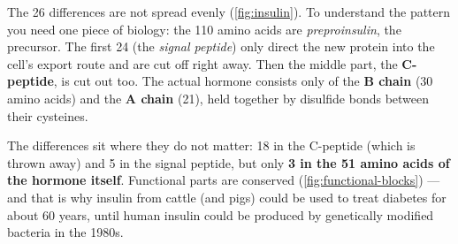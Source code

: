 \documentclass[11pt, oneside]{book}
\begin{document}
\begin{exbox}[title={Where are the differences --- and why there}]
The 26 differences are not spread evenly (\cref{fig:insulin}). To understand
the pattern you need one piece of biology: the 110 amino acids are
\emph{preproinsulin}, the precursor. The first 24 (the \emph{signal peptide})
only direct the new protein into the cell's export route and are cut off
right away. Then the middle part,
the \textbf{C-peptide}, is cut out too. The actual hormone consists only of the
\textbf{B chain} (30 amino acids) and the \textbf{A chain} (21), held together by
disulfide bonds between their cysteines.

The differences sit where they do not matter: 18 in the C-peptide (which is
thrown away) and 5 in the signal peptide, but only \textbf{3 in the 51 amino
acids of the hormone itself}. Functional parts are conserved
(\cref{fig:functional-blocks}) --- and that is why insulin from cattle (and
pigs) could be used to treat diabetes for about 60 years, until human insulin
could be produced by genetically modified bacteria in the 1980s.
\end{exbox}
\end{document}
